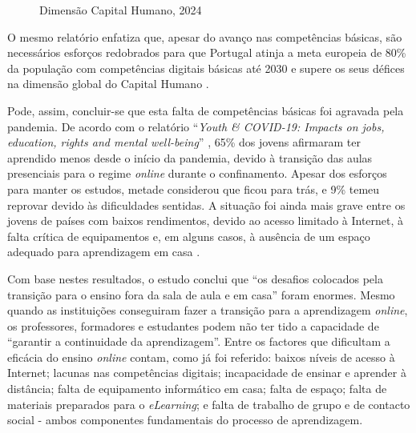\begin{figure}[hbtp]
	\centering%
		\centering
		\qquad
		\caption{Dimensão Capital Humano, 2024 \cite{itu2024facts}}%
		\label{fig:capitalhumano}%
	\end{figure}

O mesmo relatório enfatiza que, apesar do avanço nas competências básicas, são necessários esforços redobrados para que Portugal atinja a meta europeia de 80\% da população com competências digitais básicas até 2030 e supere os seus défices na dimensão global do Capital Humano \cite{DESI2024}.

Pode, assim, concluir-se que esta falta de competências básicas foi agravada pela pandemia. De acordo com o relatório ``\textit{Youth \& COVID-19: Impacts on jobs, education, rights and mental well-being}'' \cite{impactocovideducacao}, 65\% dos jovens afirmaram ter aprendido menos desde o início da pandemia, devido à transição das aulas presenciais para o regime \textit{online} durante o confinamento. Apesar dos esforços para manter os estudos, metade considerou que ficou para trás, e 9\% temeu reprovar devido às dificuldades sentidas. A situação foi ainda mais grave entre os jovens de países com baixos rendimentos, devido ao acesso limitado à Internet, à falta crítica de equipamentos e, em alguns casos, à ausência de um espaço adequado para aprendizagem em casa \cite{impactocovideducacao}.

Com base nestes resultados, o estudo conclui que ``os desafios colocados pela transição para o ensino fora da sala de aula e em casa'' foram enormes. Mesmo quando as instituições conseguiram fazer a transição para a aprendizagem \textit{online}, os professores, formadores e estudantes podem não ter tido a capacidade de ``garantir a continuidade da aprendizagem''. Entre os factores que dificultam a eficácia do ensino \textit{online} contam, como já foi referido: baixos níveis de acesso à Internet; lacunas nas competências digitais; incapacidade de ensinar e aprender à distância; falta de equipamento informático em casa; falta de espaço; falta de materiais preparados para o \textit{eLearning}; e falta de trabalho de grupo e de contacto social - ambos componentes fundamentais do processo de aprendizagem.

